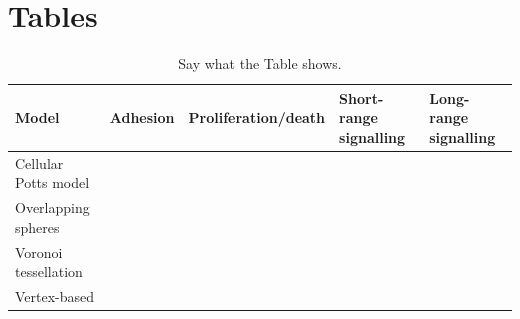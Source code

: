 \documentclass[12pt]{article}
\begin{document}

\clearpage
\section{Tables}

\begin{table}
\centering
\begin{tabular}{lllll}
\toprule
Model & Adhesion & Proliferation/death & Short-range signalling & Long-range signalling \\
\midrule
Cellular Potts model &  &  &  &  \\ 
Overlapping spheres &  &  &  &  \\ 
Voronoi tessellation &  &  &  &  \\ 
Vertex-based &  &  &  &  \\ 
\bottomrule
\end{tabular}
\caption{Say what the Table shows.}
\label{tab:properties}
\end{table}

\end{document}
